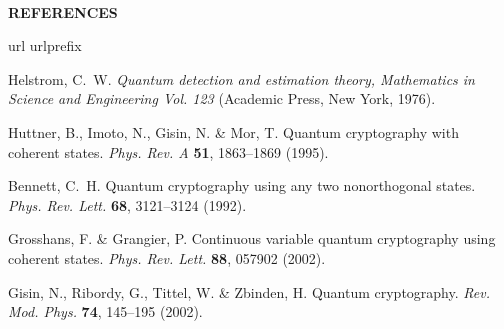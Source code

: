 \documentclass[twocolumn,pra,preprintnumbers,amsmath,amssymb,superscriptaddress,floatfix]{revtex4}%
\begin{document}
\\
%
\noindent
\textbf{REFERENCES}
%
%
\begin{thebibliography}{10}
\expandafter\ifx\csname url\endcsname\relax
  \def\url#1{\texttt{#1}}\fi
\expandafter\ifx\csname urlprefix\endcsname\relax\def\urlprefix{URL }\fi
\providecommand{\bibinfo}[2]{#2}
\providecommand{\eprint}[2][]{\url{#2}}

\bibinfo{author}{Helstrom, C.~W.}
\newblock \emph{\bibinfo{title}{Quantum detection and estimation theory,
  Mathematics in Science and Engineering Vol. 123}}
  (\bibinfo{publisher}{Academic Press}, \bibinfo{address}{New York},
  \bibinfo{year}{1976}).

\bibinfo{author}{Huttner, B.}, \bibinfo{author}{Imoto, N.},
  \bibinfo{author}{Gisin, N.} \& \bibinfo{author}{Mor, T.}
\newblock \bibinfo{title}{Quantum cryptography with coherent states}.
\newblock \emph{\bibinfo{journal}{Phys. Rev. A}} \textbf{\bibinfo{volume}{51}},
  \bibinfo{pages}{1863--1869} (\bibinfo{year}{1995}).

\bibinfo{author}{Bennett, C.~H.}
\newblock \bibinfo{title}{Quantum cryptography using any two nonorthogonal
  states}.
\newblock \emph{\bibinfo{journal}{Phys. Rev. Lett.}}
  \textbf{\bibinfo{volume}{68}}, \bibinfo{pages}{3121--3124}
  (\bibinfo{year}{1992}).

\bibinfo{author}{Grosshans, F.} \& \bibinfo{author}{Grangier, P.}
\newblock \bibinfo{title}{Continuous variable quantum cryptography using
  coherent states}.
\newblock \emph{\bibinfo{journal}{Phys. Rev. Lett.}}
  \textbf{\bibinfo{volume}{88}}, \bibinfo{pages}{057902}
  (\bibinfo{year}{2002}).

\bibinfo{author}{Gisin, N.}, \bibinfo{author}{Ribordy, G.},
  \bibinfo{author}{Tittel, W.} \& \bibinfo{author}{Zbinden, H.}
\newblock \bibinfo{title}{Quantum cryptography}.
\newblock \emph{\bibinfo{journal}{Rev. Mod. Phys.}}
  \textbf{\bibinfo{volume}{74}}, \bibinfo{pages}{145--195}
  (\bibinfo{year}{2002}).


\end{thebibliography}
\end{document}
